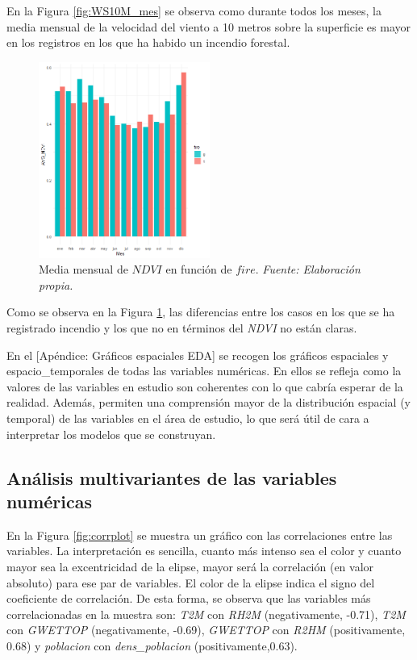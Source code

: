 \documentclass[12pt,a4paper,]{book}
\numberwithin{dummy}{section}
\theoremstyle{ocrenumbox}
\theoremstyle{blacknumex}
\theoremstyle{blacknumbox}
\theoremstyle{ocrenum}
\theoremstyle{ocrenum}
\begin{document}
En la Figura \ref{fig:WS10M_mes} se observa como durante todos los
meses, la media mensual de la velocidad del viento a 10 metros sobre la
superficie es mayor en los registros en los que ha habido un incendio
forestal.

\begin{figure}[H]
\centering
\includegraphics[width = 0.5\textwidth]{graficos/NDVI_mes.png}
\caption{Media mensual de $NDVI$ en función de $fire$. \it Fuente: Elaboración propia.}
\label{fig:NDVI_mes}
\end{figure}

Como se observa en la Figura \ref{fig:NDVI_mes}, las diferencias entre
los casos en los que se ha registrado incendio y los que no en términos
del \emph{NDVI} no están claras.

En el {[}Apéndice: Gráficos espaciales EDA{]} se recogen los gráficos
espaciales y espacio\_temporales de todas las variables numéricas. En
ellos se refleja como la valores de las variables en estudio son
coherentes con lo que cabría esperar de la realidad. Además, permiten
una comprensión mayor de la distribución espacial (y temporal) de las
variables en el área de estudio, lo que será útil de cara a interpretar
los modelos que se construyan.

\hypertarget{anuxe1lisis-multivariantes-de-las-variables-numuxe9ricas}{%
\subsection{Análisis multivariantes de las variables
numéricas}\label{anuxe1lisis-multivariantes-de-las-variables-numuxe9ricas}}

En la Figura \ref{fig:corrplot} se muestra un gráfico con las
correlaciones entre las variables. La interpretación es sencilla, cuanto
más intenso sea el color y cuanto mayor sea la excentricidad de la
elipse, mayor será la correlación (en valor absoluto) para ese par de
variables. El color de la elipse indica el signo del coeficiente de
correlación. De esta forma, se observa que las variables más
correlacionadas en la muestra son: \emph{T2M} con \emph{RH2M}
(negativamente, -0.71), \emph{T2M} con \emph{GWETTOP} (negativamente,
-0.69), \emph{GWETTOP} con \emph{R2HM} (positivamente, 0.68) y
\emph{poblacion} con \emph{dens\_poblacion} (positivamente,0.63).
\end{document}
